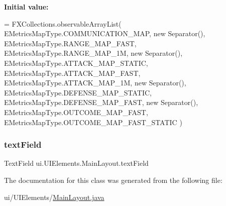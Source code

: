 {\bfseries Initial value\+:}
\begin{DoxyCode}
=
            FXCollections.observableArrayList(
                    EMetricsMapType.COMMUNICATION\_MAP,
                    \textcolor{keyword}{new} Separator(),
                    EMetricsMapType.RANGE\_MAP\_FAST,
                    EMetricsMapType.RANGE\_MAP\_1M,
                    \textcolor{keyword}{new} Separator(),
                    EMetricsMapType.ATTACK\_MAP\_STATIC,
                    EMetricsMapType.ATTACK\_MAP\_FAST,
                    EMetricsMapType.ATTACK\_MAP\_1M,
                    \textcolor{keyword}{new} Separator(),
                    EMetricsMapType.DEFENSE\_MAP\_STATIC,
                    EMetricsMapType.DEFENSE\_MAP\_FAST,
                    \textcolor{keyword}{new} Separator(),
                    EMetricsMapType.OUTCOME\_MAP\_FAST,
                    EMetricsMapType.OUTCOME\_MAP\_FAST\_STATIC
            )
\end{DoxyCode}
\mbox{\label{classui_1_1_u_i_elements_1_1_main_layout_a3323a9ec07f10c0971186a997ba9d459}} 
\subsubsection{\texorpdfstring{text\+Field}{textField}}
{\footnotesize\ttfamily Text\+Field ui.\+U\+I\+Elements.\+Main\+Layout.\+text\+Field\hspace{0.3cm}{\ttfamily [private]}}



The documentation for this class was generated from the following file\+:\begin{DoxyCompactItemize}
\item 
ui/\+U\+I\+Elements/\mbox{\hyperlink{_main_layout_8java}{Main\+Layout.\+java}}\end{DoxyCompactItemize}
